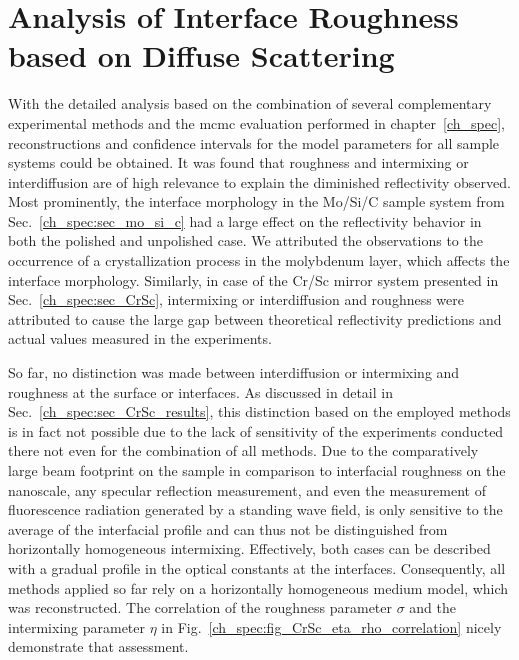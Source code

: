 \chapter{Analysis of Interface Roughness based on Diffuse Scattering} \label{ch_diff}
With the detailed analysis based on the combination of several complementary experimental methods and the \gls{mcmc} evaluation performed in chapter~\ref{ch_spec}, reconstructions and confidence intervals for the model parameters for all sample systems could be obtained. It was found that roughness and intermixing or interdiffusion are of high relevance to explain the diminished reflectivity observed. Most prominently, the interface morphology in the Mo/Si/C sample system from Sec.~\ref{ch_spec:sec_mo_si_c} had a large effect on the reflectivity behavior in both the polished and unpolished case. We attributed the observations to the occurrence of a crystallization process in the molybdenum layer, which affects the interface morphology. Similarly, in case of the Cr/Sc mirror system presented in Sec.~\ref{ch_spec:sec_CrSc}, intermixing or interdiffusion and roughness were attributed to cause the large gap between theoretical reflectivity predictions and actual values measured in the experiments.

So far, no distinction was made between interdiffusion or intermixing and roughness at the surface or interfaces. As discussed in detail in Sec.~\ref{ch_spec:sec_CrSc_results}, this distinction based on the employed methods is in fact not possible due to the lack of sensitivity of the experiments conducted there not even for the combination of all methods. Due to the comparatively large beam footprint on the sample in comparison to interfacial roughness on the nanoscale, any specular reflection measurement, and even the measurement of fluorescence radiation generated by a standing wave field, is only sensitive to the average of the interfacial profile and can thus not be distinguished from horizontally homogeneous intermixing. Effectively, both cases can be described with a gradual profile in the optical constants at the interfaces. Consequently, all methods applied so far rely on a horizontally homogeneous medium model, which was reconstructed. The correlation of the roughness parameter $\sigma$ and the intermixing parameter $\eta$ in Fig.~\ref{ch_spec:fig_CrSc_eta_rho_correlation} nicely demonstrate that assessment.

